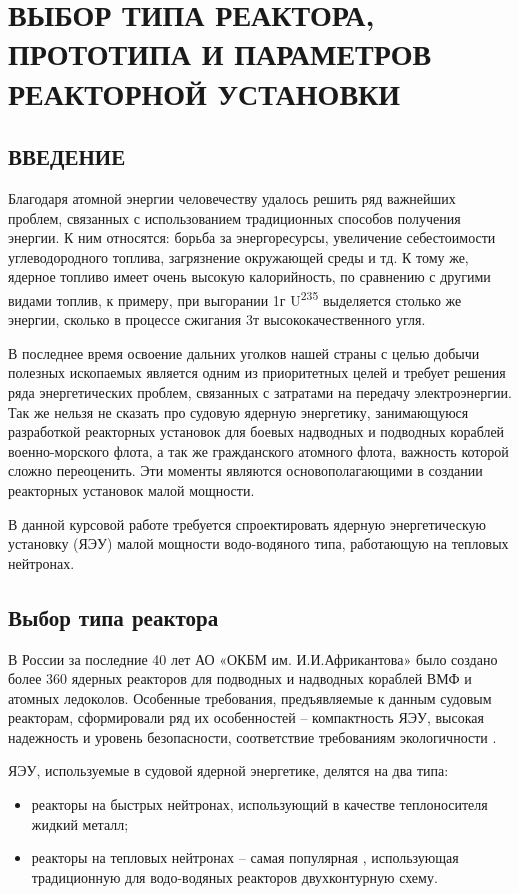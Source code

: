 \chapter{ВЫБОР ТИПА РЕАКТОРА, ПРОТОТИПА И ПАРАМЕТРОВ РЕАКТОРНОЙ
УСТАНОВКИ}

\section{ВВЕДЕНИЕ}

Благодаря атомной энергии человечеству удалось решить ряд важнейших
проблем, связанных с использованием традиционных способов получения
энергии. К ним относятся: борьба за энергоресурсы, увеличение
себестоимости углеводородного топлива, загрязнение окружающей среды и
тд. К тому же, ядерное топливо имеет очень высокую калорийность, по
сравнению с другими видами топлив, к примеру, при выгорании 1г
U\textsuperscript{235} выделяется столько же энергии, сколько в процессе
сжигания 3т высококачественного угля.

В последнее время освоение дальних уголков нашей страны с целью добычи
полезных ископаемых является одним из приоритетных целей и требует
решения ряда энергетических проблем, связанных с затратами на передачу
электроэнергии. Так же нельзя не сказать про судовую ядерную энергетику,
занимающуюся разработкой реакторных установок для боевых надводных и
подводных кораблей военно-морского флота, а так же гражданского атомного
флота, важность которой сложно переоценить. Эти моменты являются
основополагающими в создании реакторных установок малой мощности.

В данной курсовой работе требуется спроектировать ядерную энергетическую
установку (ЯЭУ) малой мощности водо-водяного типа, работающую на
тепловых нейтронах.


\section{Выбор типа реактора}

В России за последние 40 лет АО «ОКБМ им. И.И.Африкантова» было создано
более 360 ядерных реакторов для подводных и надводных кораблей ВМФ и
атомных ледоколов. Особенные требования, предъявляемые к данным судовым
реакторам, сформировали ряд их особенностей -- компактность ЯЭУ, высокая
надежность и уровень безопасности, соответствие требованиям
экологичности \cite{peb}.

ЯЭУ, используемые в судовой ядерной энергетике, делятся на два типа:

\begin{itemize}
\item
  реакторы на быстрых нейтронах, использующий в качестве теплоносителя
  жидкий металл;
\item
  реакторы на тепловых нейтронах -- самая популярная , использующая
  традиционную для водо-водяных реакторов двухконтурную схему.
\end{itemize}

